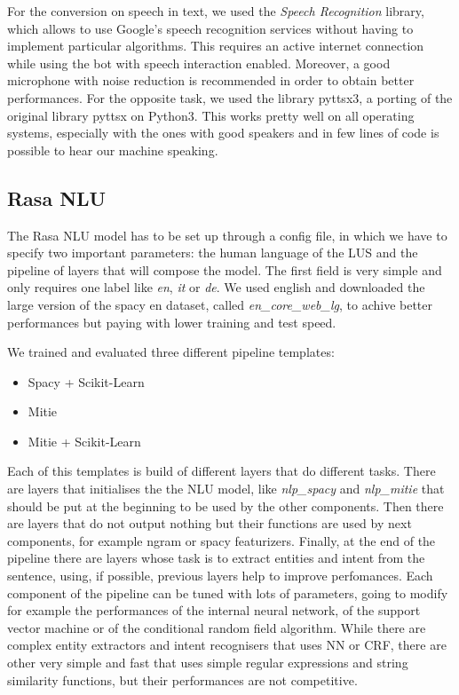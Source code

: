 \documentclass[11pt,a4paper]{article}
\begin{document}
For the conversion on speech in text, we used the \textit{Speech Recognition} library, which allows to use Google's speech recognition services without having to implement particular algorithms. This requires an active internet connection while using the bot with speech interaction enabled. Moreover, a good microphone with noise reduction is recommended in order to obtain better performances.
For the opposite task, we used the library pyttsx3, a porting of the original library pyttsx on Python3. This works pretty well on all operating systems, especially with the ones with good speakers and in few lines of code is possible to hear our machine speaking.

\subsection{Rasa NLU}

The Rasa NLU model has to be set up through a config file, in which we have to specify two important parameters: the human language of the LUS and the pipeline of layers that will compose the model. The first field is very simple and only requires one label like \textit{en}, \textit{it} or \textit{de}. We used english and downloaded the large version of the spacy en dataset, called \textit{en\_core\_web\_lg}, to achive better performances but paying with lower training and test speed.

We trained and evaluated three different pipeline templates: 
\begin{itemize}
\item Spacy + Scikit-Learn
\item Mitie
\item Mitie + Scikit-Learn
\end{itemize}

Each of this templates is build of different layers that do different tasks. There are layers that initialises the the NLU model, like \textit{nlp\_spacy} and \textit{nlp\_mitie} that should be put at the beginning to be used by the other components. Then there are layers that do not output nothing but their functions are used by next components, for example ngram or spacy featurizers. Finally, at the end of the pipeline there are layers whose task is to extract entities and intent from the sentence, using, if possible, previous layers help to improve perfomances.
Each component of the pipeline can be tuned with lots of parameters, going to modify for example the performances of the internal neural network, of the support vector machine or of the conditional random field algorithm. While there are complex entity extractors and intent recognisers that uses NN or CRF, there are other very simple and fast that uses simple regular expressions and string similarity functions, but their performances are not competitive.
\end{document}
